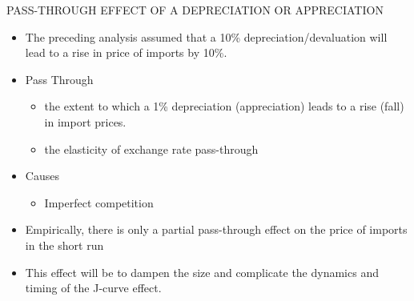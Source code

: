 \documentclass[10pt,hyperref={CJKbookmarks=true},xcolor=dvipsnames,aspectratio=169]{beamer}
\begin{document}
\begin{frame}{PASS-THROUGH EFFECT OF A DEPRECIATION OR APPRECIATION}

\begin{itemize}
\item The preceding analysis assumed that a 10\% depreciation/devaluation
will lead to a rise in price of imports by 10\%.
\item Pass Through

\begin{itemize}
\item the extent to which a 1\% depreciation (appreciation) leads to a rise
(fall) in import prices. 
\item the elasticity of exchange rate pass-through
\end{itemize}
\item Causes

\begin{itemize}
\item Imperfect competition
\end{itemize}
\item Empirically, there is only a partial pass-through effect on the price
of imports in the short run
\item This effect will be to dampen the size and complicate the dynamics
and timing of the J-curve effect.
\end{itemize}
\end{frame}
\end{document}
